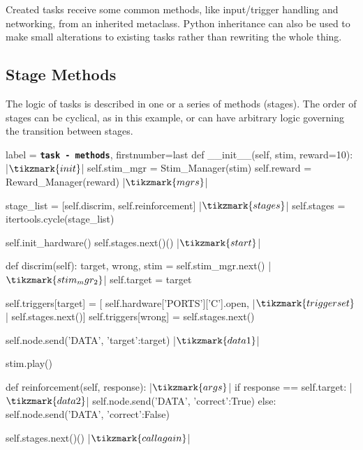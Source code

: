 \documentclass[nohyper, justified, notitlepage, marginals=raggedright,twoside=false,debug]{tufte-autopilot}
\begin{document}
Created tasks receive some common methods, like input/trigger handling and networking, from an inherited metaclass. Python inheritance can also be used to make small alterations to existing tasks rather than rewriting the whole thing.

\subsection{Stage Methods}

The logic of tasks is described in one or a series of methods (stages). The order of stages can be cyclical, as in this example, or can have arbitrary logic governing the transition between stages.
\vspace{10pt}

\begin{pythoncode*}{label = \texttt{\textbf{task - methods}}, firstnumber=last}
    def __init__(self, stim, reward=10): |$\tikzmark{init}$|
        self.stim_mgr = Stim_Manager(stim)
        self.reward   = Reward_Manager(reward) |$\tikzmark{mgrs}$|

        stage_list  = [self.discrim, self.reinforcement] |$\tikzmark{stages}$|
        self.stages = itertools.cycle(stage_list)

        self.init_hardware()
        self.stages.next()() |$\tikzmark{start}$|

    def discrim(self):
        target, wrong, stim = self.stim_mgr.next() |$\tikzmark{stim_mgr_2}$|
        self.target = target

        self.triggers[target] = [
            self.hardware['PORTS']['C'].open, |$\tikzmark{triggerset}$|
            self.stages.next()]
        self.triggers[wrong] = self.stages.next()

        self.node.send('DATA', {'target':target}) |$\tikzmark{data1}$|

        stim.play()

    def reinforcement(self, response): |$\tikzmark{args}$|
        if response == self.target: |$\tikzmark{data2}$|
            self.node.send('DATA', {'correct':True})
        else:
            self.node.send('DATA', {'correct':False})

        self.stages.next()() |$\tikzmark{callagain}$|
\end{pythoncode*}
\end{document}
